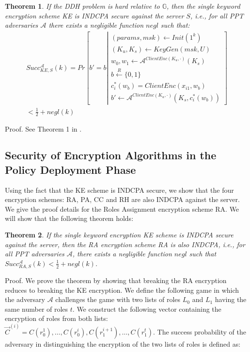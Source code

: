 \documentclass[epsfig,a4paper,11pt,titlepage]{book}
\newtheorem{theorem}{Theorem}
\numberwithin{algorithm}{chapter}
\begin{document}
\begin{theorem}
If the \gls{DDH} problem is hard relative to $\mathbb{G}$, then the single keyword encryption scheme \gls{KE} is \gls{INDCPA} secure against the server $\mathit{S}$, i.e., for all \gls{PPT} adversaries $\mathcal{A}$ there exists a negligible function $negl$ such that:
\begin{equation}
\begin{array}{l}
Succ_{KE, S}^{\mathcal{A}}(k) = Pr \left[ b'=b \left|
\begin{matrix}
(params, msk) \leftarrow Init(1^k)\\
(K_u,K_s) \leftarrow KeyGen(msk,U)\\
w_0,w_1 \leftarrow \mathcal{A}^{ClientEnc(K_u, \cdot)}(K_s)\\
b \xleftarrow{R} \{0,1\}\\
c_i^*(w_b) = ClientEnc(x_{i1},w_b) \\
b' \leftarrow \mathcal{A}^{ClientEnc(K_u, \cdot)}(K_s,c^*_i(w_b))
\end{matrix}
\right]\right. \\
<\frac{1}{2} + negl(k)
\end{array}
\end{equation}
\end{theorem}

Proof. See Theorem 1 in \cite{Dong:2011}.

\subsection{Security of Encryption Algorithms in the Policy Deployment Phase}
Using the fact that the \gls{KE} scheme is \gls{INDCPA} secure, we show that the four encryption schemes: \gls{RA}, \gls{PA}, \gls{CC} and \gls{RH} are also \gls{INDCPA} against the server. We give the proof details for the Roles Assignment encryption scheme \gls{RA}. We will show that the following theorem holds:

\begin{theorem}
If the single keyword encryption \gls{KE} scheme is \gls{INDCPA} secure against the server, then the \gls{RA} encryption scheme \gls{RA} is also \gls{INDCPA}, i.e., for all \gls{PPT} adversaries $\mathcal{A}$, there exists a negligible function $negl$ such that
$Succ_{RA,S}^{\mathcal{A}}(k) < \frac{1}{2} + negl(k)$.
\end{theorem}

Proof. We prove the theorem by showing that breaking the \gls{RA} encryption reduces to breaking the \gls{KE} encryption. We define the following game in which the adversary $\mathcal{A}$ challenges the game with two lists of roles $L_0$ and $L_1$ having the same number of roles $t$. We construct the following vector containing the encryption of roles from both lists: $\vec{C}^{(i)} = C(r_0^1), \ldots, C(r_0^i), C(r_1^{i+1}), \ldots, C(r_1^t)$. The success probability of the adversary in distinguishing the encryption of the two lists of roles is defined as:
\end{document}
